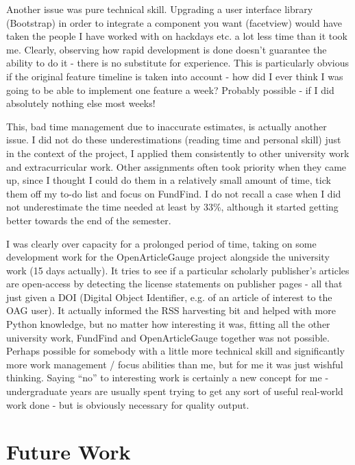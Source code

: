 Another issue was pure technical skill. Upgrading a user interface library (Bootstrap) in order to integrate a component you want (facetview) would have taken the people I have worked with on hackdays etc. a lot less time than it took me. Clearly, observing how rapid development is done doesn't guarantee the ability to do it - there is no substitute for experience. This is particularly obvious if the original feature timeline is taken into account - how did I ever think I was going to be able to implement one feature a week? Probably possible - if I did absolutely nothing else most weeks!

This, bad time management due to inaccurate estimates, is actually another issue. I did not do these underestimations (reading time and personal skill) just in the context of the project, I applied them consistently to other university work and extracurricular work. Other assignments often took priority when they came up, since I thought I could do them in a relatively small amount of time, tick them off my to-do list and focus on FundFind. I do not recall a case when I did not underestimate the time needed at least by 33\%, although it started getting better towards the end of the semester.

I was clearly over capacity for a prolonged period of time, taking on some development work for the OpenArticleGauge project alongside the university work (15 days actually). It tries to see if a particular scholarly publisher's articles are open-access by detecting the license statements on publisher pages - all that just given a DOI (Digital Object Identifier, e.g. of an article of interest to the OAG user). It actually informed the RSS harvesting bit and helped with more Python knowledge, but no matter how interesting it was, fitting all the other university work, FundFind and OpenArticleGauge together was not possible. Perhaps possible for somebody with a little more technical skill and significantly more work management / focus abilities than me, but for me it was just wishful thinking. Saying ``no'' to interesting work is certainly a new concept for me - undergraduate years are usually spent trying to get any sort of useful real-world work done - but is obviously necessary for quality output.

\section{Future Work}
\label{future-work}

